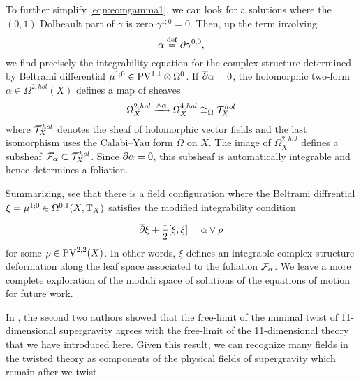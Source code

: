 To further simplify \eqref{eqn:eomgamma1}, we can look for a solutions where the $(0,1)$ Dolbeault part of $\gamma$ is zero $\gamma^{1;0} = 0$. 
Then, up the term involving 
\[
\alpha \overset{\rm def}{=} \partial \gamma^{0;0},
\]
we find precisely the integrability equation for the complex structure determined by Beltrami differential $\mu^{1;0} \in {\rm PV}^{1,1} \otimes \Omega^0$. 
If $\overline{\partial} \alpha = 0$, the holomorphic two-form $\alpha \in \Omega^{2,hol}(X)$ defines a map of sheaves
\[
\Omega^{2,hol}_X \xrightarrow{\wedge \alpha} \Omega^{4,hol}_X \cong_\Omega \mathcal T^{hol}_X
\]
where $\mathcal T^{hol}_X$ denotes the sheaf of holomorphic vector fields and the last isomorphism uses the Calabi--Yau form $\Omega$ on $X$.  
The image of $\Omega^{2,hol}_X$ defines a subsheaf $\mathcal F_{\alpha} \subset \mathcal T^{hol}_X$. 
Since $\partial \alpha = 0$, this subsheaf is automatically integrable and hence determines a foliation. 

Summarizing, see that there is a field configuration where the Beltrami diffrential $\xi = \mu^{1;0} \in \Omega^{0,1}(X, {\rm T}_X)$ satisfies the modified integrability condition
\[
\overline{\partial} \xi + \frac12  [\xi , \xi] = \alpha \vee \rho
\]
for some $\rho \in {\rm PV}^{2,2} (X)$. 
In other words, $\xi$ defines an integrable complex structure deformation along the leaf space associated to the foliation $\mathcal F_\alpha$. 
We leave a more complete exploration of the moduli space of solutions of the equations of motion for future work. 

In \cite{SWspinor}, the second two authors showed that the free-limit of the minimal twist of 11-dimensional supergravity agrees with the free-limit of the 11-dimensional theory that we have introduced here. 
Given this result, we can recognize many fields in the twisted theory as components of the physical fields of supergravity which remain after we twist. 


